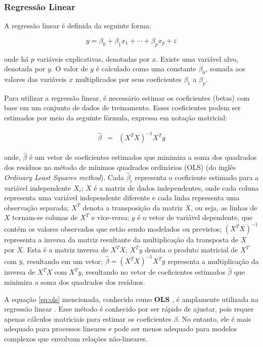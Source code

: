  
 \subsubsection{Regress\~ao Linear}
 
 A regressão linear é definida da seguinte forma:
 
 \begin{equation}
 	y = \beta_0 + \beta_1 x_1 + \cdots + \beta_p x_p + \varepsilon \label{eq:lr}
 \end{equation}
 
 \noindent onde há $p$ variáveis explicativas, denotadas por $x$. Existe uma variável alvo, denotada por $y$. O valor de $y$ é calculado como uma constante $\beta_0$, somada aos valores das variáveis $x$ multiplicados por seus coeficientes $\beta_1$ a $\beta_p$.
 
 
 Para utilizar a regressão linear, é necessário estimar os coeficientes (betas) com base em um conjunto de dados de treinamento. Esses coeficientes podem ser estimados por meio da seguinte fórmula, expressa em notação matricial:
 
 \begin{eqnarray}
 	\hat{\beta}&=&\left(X^T X\right)^{-1} X^T y\label{eq:ols}
 \end{eqnarray}
 
 \noindent onde, $\hat{\beta}$ é um vetor de coeficientes estimados que minimiza a soma dos quadrados dos resíduos no método de mínimos quadrados ordinários (OLS) (do inglês \textit{Ordinary Least Squares method}). Cada $\hat{\beta}_i$ representa o coeficiente estimado para a variável independente $X_i$;
 $X$ é a matriz de dados independentes, onde cada coluna representa uma variável independente diferente e cada linha representa uma observação separada;
 $X^T$ denota a transposição da matriz $X$, ou seja, as linhas de $X$ tornam-se colunas de $X^T$ e vice-versa;
 $y$ é o vetor de variável dependente, que contém os valores observados que estão sendo modelados ou previstos;
 $\left(X^T X\right)^{-1}$ representa a inversa da matriz resultante da multiplicação da transposta de $X$ por $X$. Esta é a matriz inversa de $X^T X$;
 $X^T y$ denota o produto matricial de $X^T$ com $y$, resultando em um vetor;
 $\hat{\beta}=\left(X^T X\right)^{-1} X^T y$ representa a multiplicação da inversa de $X^T X \operatorname{com} X^T y$, resultando no vetor de coeficientes estimados $\hat{\beta}$ que minimiza a soma dos quadrados dos resíduos.
 
 A equação \eqref{eq:ols} mencionada, conhecida como \textbf{OLS} , é amplamente utilizada na regressão linear \cite{korstanje2021}. Esse método é conhecido por ser rápido de ajustar, pois requer apenas cálculos matriciais para estimar os coeficientes $\beta$. No entanto, ele é mais adequado para processos lineares e pode ser menos adequado para modelos complexos que envolvam relações não-lineares.
 
